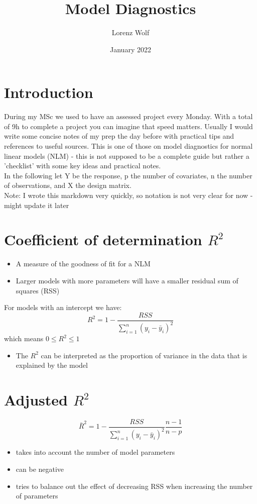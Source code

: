 \documentclass{article}
\title{Model Diagnostics}
\author{Lorenz Wolf}
\date{January 2022}
\begin{document}
\maketitle


\section{Introduction} 

During my MSc we used to have an assessed project every Monday. With a total of 9h to complete a project you can imagine that speed matters. 
Usually I would write some concise notes of my prep the day before with practical tips and references to useful sources. 
This is one of those on model diagnostics for normal linear models (NLM) - this is not supposed to be a complete guide but rather a 'checklist' with some key ideas and practical notes.\\

In the following let Y be the response, p the number of covariates, n the number of observations, and X the design matrix.\\

Note: I wrote this markdown very quickly, so notation is not very clear for now - might update it later

\section{Coefficient of determination $R^2$}
\begin{itemize}
    \item A measure of the goodness of fit for a NLM
    \item Larger models with more parameters will have a smaller residual sum of squares (RSS)
\end{itemize}
For models with an intercept we have: $$R^2 = 1 - \frac{RSS}{\sum_{i=1}^n (y_i-\bar{y}_i)^2}$$
which means $0 \leq R^2 \leq 1$
\begin{itemize}
    \item The $R^2$ can be interpreted as the proportion of variance in the data that is explained by the model
\end{itemize}

\section{Adjusted $R^2$}
$$\bar{R}^2 = 1 - \frac{RSS}{\sum_{i=1}^n (y_i-\bar{y}_i)^2} \frac{n-1}{n-p}$$
\begin{itemize}
    \item takes into account the number of model parameters
    \item can be negative
    \item tries to balance out the effect of decreasing RSS when increasing the number of parameters
\end{itemize}
\end{document}
